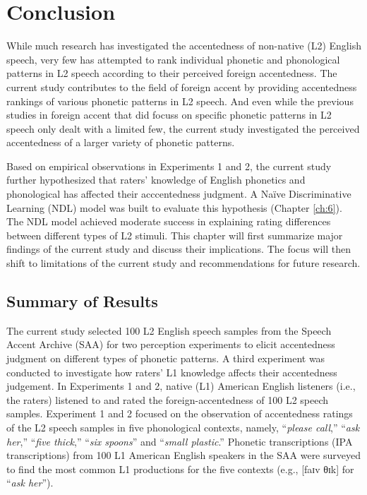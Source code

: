  \chapter{Conclusion}
 \label{ch:7}

While much research has investigated the accentedness of non-native (L2) English speech, very few has attempted to rank individual phonetic and phonological patterns in L2 speech according to their perceived foreign accentedness. The current study contributes to the field of foreign accent by providing accentedness rankings of various phonetic patterns in L2 speech. And even while the previous studies in foreign accent that did focuss on specific phonetic patterns in L2 speech only dealt with a limited few, the current study investigated the perceived accentedness of a larger variety of phonetic patterns.

Based on empirical observations in Experiments 1 and 2, the current study further hypothesized that raters' knowledge of English phonetics and phonological has affected their acccentedness judgment. A Naïve Discriminative Learning (NDL) model was built to evaluate this hypothesis (Chapter \ref{ch:6}). The NDL model achieved moderate success in explaining rating differences between different types of L2 stimuli. This chapter will first summarize major findings of the current study and discuss their implications. The focus will then shift to limitations of the current study and recommendations for future research.

\section{Summary of Results}

The current study selected 100 L2 English speech samples from the Speech Accent Archive (SAA) for two perception experiments to elicit accentedness judgment on different types of phonetic patterns. A third experiment was conducted to investigate how raters’ L1 knowledge affects their accentedness judgement. In Experiments 1 and 2, native (L1) American English listeners (i.e., the raters) listened to and rated the foreign-accentedness of 100 L2 speech samples. Experiment 1 and 2 focused on the observation of accentedness ratings of the L2 speech samples in five phonological contexts, namely, “\textit{please call},” “\textit{ask her},” “\textit{five thick},” “\textit{six spoons}” and “\textit{small plastic}.” Phonetic transcriptions (IPA transcriptions) from 100 L1 American English speakers in the SAA were surveyed to find the most common L1 productions for the five contexts (e.g., [faɪv θɪk] for “\textit{ask her}”). 

